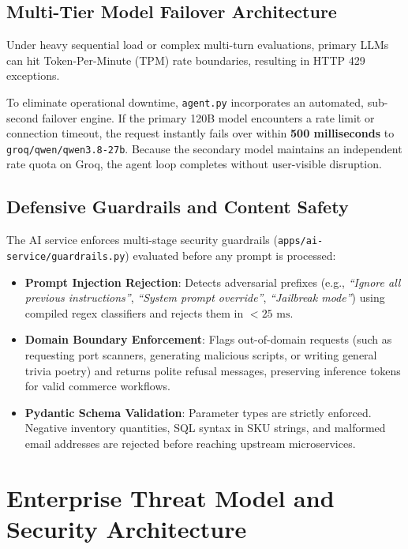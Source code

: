 \documentclass[11pt,a4paper]{article}
\begin{document}
\subsection{Multi-Tier Model Failover Architecture}
Under heavy sequential load or complex multi-turn evaluations, primary LLMs can hit Token-Per-Minute (TPM) rate boundaries, resulting in HTTP 429 exceptions. 

To eliminate operational downtime, \texttt{agent.py} incorporates an automated, sub-second failover engine. If the primary 120B model encounters a rate limit or connection timeout, the request instantly fails over within \textbf{500 milliseconds} to \texttt{groq/qwen/qwen3.8-27b}. Because the secondary model maintains an independent rate quota on Groq, the agent loop completes without user-visible disruption.

\subsection{Defensive Guardrails and Content Safety}
The AI service enforces multi-stage security guardrails (\texttt{apps/ai-service/guardrails.py}) evaluated before any prompt is processed:
\begin{itemize}[leftmargin=*]
    \item \textbf{Prompt Injection Rejection}: Detects adversarial prefixes (e.g., \textit{``Ignore all previous instructions''}, \textit{``System prompt override''}, \textit{``Jailbreak mode''}) using compiled regex classifiers and rejects them in \textbf{$<25\text{ ms}$}.
    \item \textbf{Domain Boundary Enforcement}: Flags out-of-domain requests (such as requesting port scanners, generating malicious scripts, or writing general trivia poetry) and returns polite refusal messages, preserving inference tokens for valid commerce workflows.
    \item \textbf{Pydantic Schema Validation}: Parameter types are strictly enforced. Negative inventory quantities, SQL syntax in SKU strings, and malformed email addresses are rejected before reaching upstream microservices.
\end{itemize}

\section{Enterprise Threat Model and Security Architecture}
\end{document}
